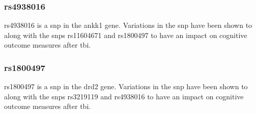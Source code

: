 \documentclass[11pt]{article}
\begin{document}
\subsubsection{rs4938016}
rs4938016 is a \gls{snp} in the \gls{ankk1} gene\cite{mcallisterSingleNucleotidePolymorphisms2008a}. Variations in the \gls{snp} have been shown to along with the \glspl{snp} rs11604671 and rs1800497 to have an impact on cognitive outcome measures after \gls{tbi}.\cite{mcallisterSingleNucleotidePolymorphisms2008a}

\subsubsection{rs1800497}
rs1800497 is a \gls{snp} in the \gls{drd2} gene\cite{Rs1800497SNPedia}. Variations in the \gls{snp} have been shown to along with the \glspl{snp} rs3219119 and rs4938016 to have an impact on cognitive outcome measures after \gls{tbi}.\cite{mcallisterSingleNucleotidePolymorphisms2008a}
\end{document}

